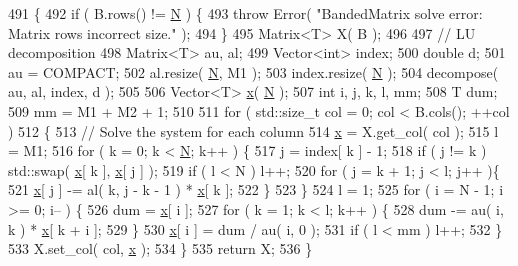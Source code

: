 \begin{DoxyCode}
491   \{
492     \textcolor{keywordflow}{if} ( B.rows() != \hyperlink{namespaceHeat__plot_a7d050092798e28458a263710837bda77}{N} ) \{
493       \textcolor{keywordflow}{throw} Error( \textcolor{stringliteral}{"BandedMatrix solve error: Matrix rows incorrect size."} );
494     \}
495     Matrix<T> X( B );
496 
497     \textcolor{comment}{// LU decomposition}
498     Matrix<T> au, al;
499     Vector<int> index;
500     \textcolor{keywordtype}{double} d;
501     au = COMPACT;
502     al.resize( \hyperlink{namespaceHeat__plot_a7d050092798e28458a263710837bda77}{N}, M1 );
503     index.resize( \hyperlink{namespaceHeat__plot_a7d050092798e28458a263710837bda77}{N} );
504     decompose( au, al, index, d );
505 
506     Vector<T> \hyperlink{namespaceHeat__plot_aa88370c16b85b784ccbde3ed88bc1991}{x}( \hyperlink{namespaceHeat__plot_a7d050092798e28458a263710837bda77}{N} );
507     \textcolor{keywordtype}{int} i, j, k, l, mm;
508     T dum;
509     mm = M1 + M2 + 1;
510 
511     \textcolor{keywordflow}{for} ( std::size\_t col = 0; col < B.cols(); ++col )
512     \{
513       \textcolor{comment}{// Solve the system for each column}
514       \hyperlink{namespaceHeat__plot_aa88370c16b85b784ccbde3ed88bc1991}{x} = X.get\_col( col );
515       l = M1;
516       \textcolor{keywordflow}{for} ( k = 0; k < \hyperlink{namespaceHeat__plot_a7d050092798e28458a263710837bda77}{N}; k++ ) \{
517         j = index[ k ] - 1;
518         \textcolor{keywordflow}{if} ( j != k ) std::swap( \hyperlink{namespaceHeat__plot_aa88370c16b85b784ccbde3ed88bc1991}{x}[ k ], \hyperlink{namespaceHeat__plot_aa88370c16b85b784ccbde3ed88bc1991}{x}[ j ] );
519         \textcolor{keywordflow}{if} ( l < N ) l++;
520         \textcolor{keywordflow}{for} ( j = k + 1; j < l; j++ )\{
521           \hyperlink{namespaceHeat__plot_aa88370c16b85b784ccbde3ed88bc1991}{x}[ j ] -= al( k, j - k - 1 ) * \hyperlink{namespaceHeat__plot_aa88370c16b85b784ccbde3ed88bc1991}{x}[ k ];
522         \}
523       \}
524       l = 1;
525       \textcolor{keywordflow}{for} ( i = N - 1; i >= 0; i-- ) \{
526         dum = \hyperlink{namespaceHeat__plot_aa88370c16b85b784ccbde3ed88bc1991}{x}[ i ];
527         \textcolor{keywordflow}{for} ( k = 1; k < l; k++ ) \{
528           dum -= au( i, k ) * \hyperlink{namespaceHeat__plot_aa88370c16b85b784ccbde3ed88bc1991}{x}[ k + i ];
529         \}
530         \hyperlink{namespaceHeat__plot_aa88370c16b85b784ccbde3ed88bc1991}{x}[ i ] = dum / au( i, 0 );
531         \textcolor{keywordflow}{if} ( l < mm ) l++;
532       \}
533       X.set\_col( col, \hyperlink{namespaceHeat__plot_aa88370c16b85b784ccbde3ed88bc1991}{x} );
534     \}
535     \textcolor{keywordflow}{return} X;
536   \}
\end{DoxyCode}


